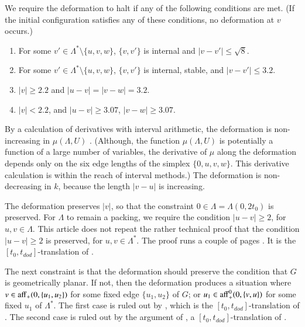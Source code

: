 We require the deformation to halt if any of the following conditions
are met.  (If the initial configuration satisfies any of these conditions,
no deformation at $v$ occurs.)
\begin{enumerate}\label{e:halt}
\item For some $v'\in\Lambda^*\setminus\{u,v,w\}$, 
$\{v,v'\}$ is internal and $|v-v'|\le \sqrt8$.
\item For some $v'\in\Lambda^*\setminus\{u,v,w\}$,
$\{v,v'\}$ is internal, stable, and $|v-v'|\le 3.2$.
\item $|v|\ge 2.2$ and $|u-v|=|v-w|=3.2$.  
\item $|v|< 2.2$, 
and $|u-v|\ge 3.07$, $|v-w|\ge 3.07$.
\end{enumerate}

By a calculation of derivatives with interval arithmetic,
the deformation is non-increasing in $\mu(\Lambda,U)$ \cite[Lemma~7.7]{arx}.  (Although, the function $\mu(\Lambda,U)$ is potentially a 
function of a large number of variables, the derivative of $\mu$
along the deformation depends only on the six edge lengths  of
the simplex $\{0,u,v,w\}$.  This derivative calculation is within
the reach of interval methods.)
The deformation is non-decreasing in $k$, because the length
$|v-u|$ is increasing.

The deformation preserves $|v|$,
so that the constraint $0\in\Lambda=\Lambda(0,2t_0)$ is preserved.
For $\Lambda$ to remain a packing, we require the condition
 $|u-v|\ge 2$, for $u,v\in \Lambda$.
This article does not repeat the rather technical proof that
the condition
 $|u-v|\ge 2$ is preserved, for $u,v\in\Lambda^*$.  The proof
runs a couple  of pages \cite[Lemma~7.6]{arx}.
It is the $[t_0,t_{dod}]$-translation of \cite[Lemma~12.20]{DCG}.

The next constraint is that the deformation should preserve the condition
that $G$ is geometrically planar.  
If not, then the deformation produces
a situation where $v\in {\operatorname{aff}}_+(0,\{u_1,u_2\})$ for some fixed edge $\{u_1,u_2\}$
of $G$; or $u_1\in {\operatorname{aff}}_+^0(0,\{v,u\})$ for some fixed $u_1$ of $\Lambda^*$.
The first case is ruled out by \cite[Remark~p.22]{arx}, which is the $[t_0,t_{dod}]$-translation of \cite[sec.12.7,p.132]{DCG}.  The second case is ruled out by 
the argument of \cite[p.27]{arx}, a $[t_0,t_{dod}]$-translation of 
\cite[sec.12.8,p.134]{DCG}.

